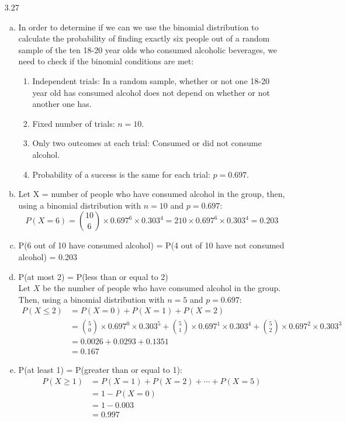 \documentclass[11pt]{article}
\newenvironment{parts}{
\vspace{-0.25cm}
\begin{enumerate}[(a)]
\setlength{\itemsep}{0mm}
}
{\end{enumerate}
}
\newenvironment{cond}{
\begin{enumerate}[1.]
\setlength{\itemsep}{0mm}
}
{\end{enumerate}
}
\begin{document}
\begin{enumerate}
\item[3.27]
\begin{parts}
\item In order to determine if we can we use the binomial distribution to calculate the probability of finding exactly six people out of a random sample of the ten 18-20 year olds who consumed alcoholic beverages, we need to check if the binomial conditions are met:
\begin{cond}
\item Independent trials: In a random sample, whether or not one 18-20 year old has consumed alcohol does not depend on whether or not another one has.
\item Fixed number of trials: $n = 10$.
\item Only two outcomes at each trial: Consumed or did not consume alcohol.
\item Probability of a success is the same for each trial: $p = 0.697$.
\end{cond}

\item Let X = number of people who have consumed alcohol in the group, then, using a binomial distribution with $n = 10$ and $p = 0.697$:
\[ P(X = 6) = {10 \choose 6} \times 0.697^6 \times 0.303^4 = 210 \times 0.697^6 \times 0.303^4 = 0.203 \]

\item P(6 out of 10 have consumed alcohol) = P(4 out of 10 have not consumed alcohol) = 0.203

\item P(at most 2) = P(less than or equal to 2) \\
Let $X$ be the number of people who have consumed alcohol in the group. Then, using a binomial distribution with $n = 5$ and $p = 0.697$: 
\begin{align*}
P(X \le 2) &= P(X = 0) + P(X = 1) + P(X = 2) \\
&= {5 \choose 0} \times 0.697^0 \times 0.303^5 + {5 \choose 1} \times 0.697^1 \times 0.303^4 + {5 \choose 2} \times 0.697^2 \times 0.303^3 \\
&= 0.0026 + 0.0293 + 0.1351  \\
&= 0.167
\end{align*}

\item P(at least 1) = P(greater than or equal to 1): 
\begin{align*}
P(X \ge 1) &= P(X = 1) + P(X = 2) + \cdots + P(X = 5) \\
&= 1 - P(X = 0) \\
&= 1 - 0.003 \\
&= 0.997
\end{align*}


\end{parts}
\end{enumerate}
\end{document}

